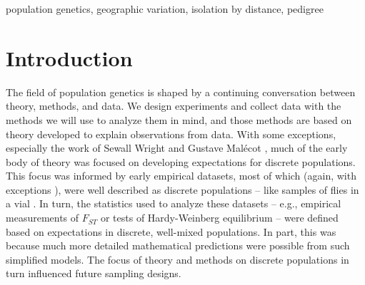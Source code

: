 \documentclass{ar-1col}
\begin{document}
\ifsubmissionversion
\begin{keywords}
population genetics, geographic variation, isolation by distance, pedigree
\end{keywords}
\maketitle
\else
\newpage
\fi

\tableofcontents

\ifsubmissionversion
\else
	\newpage
\fi

\section{Introduction}

The field of population genetics is shaped by a continuing conversation
between theory, methods, and data.
We design experiments and collect data
with the methods we will use to analyze them in mind, 
and those methods are based on theory
developed to explain observations from data.
With some exceptions,
especially the work of Sewall Wright \citeyearpar{Wright1940,Wright1943,wright1946isolation}
and Gustave Mal\'ecot \citeyearpar{malecot},
much of the early body of theory was focused on
developing expectations for discrete populations.
This focus was informed by early empirical datasets,
most of which
(again, with exceptions \citep[e.g.,][]{Dobzhansky_Wright1943, dobzhansky1947}),
were well described as discrete populations --
like samples of flies in a vial \citep{lewontin1974}.
In turn, 
the statistics used to analyze these datasets --
e.g., empirical measurements of $F_{ST}$ \citep{Wright1951}
or tests of Hardy-Weinberg equilibrium \citep{hardy1908,weinberg1908} --
were defined based on expectations in discrete, well-mixed populations.
In part, this was because much more detailed mathematical predictions 
were possible from such simplified models.
The focus of theory and methods on discrete populations in turn influenced
future sampling designs.
\end{document}
